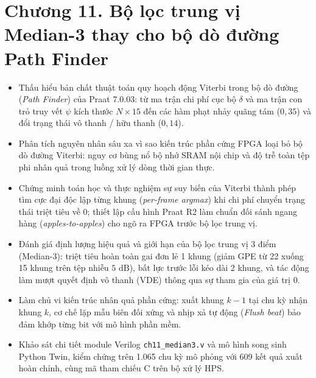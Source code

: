 \clearpage
{}
\section*{Chương 11. Bộ lọc trung vị Median-3 thay cho bộ dò đường Path Finder}

\begin{learningobj}
\begin{itemize}
    \item Thấu hiểu bản chất thuật toán quy hoạch động Viterbi trong bộ dò đường (\emph{Path Finder}) của Praat 7.0.03: từ ma trận chi phí cục bộ $\delta$ và ma trận con trỏ truy vết $\psi$ kích thước $N \times 15$ đến các hàm phạt nhảy quãng tám ($0{,}35$) và đổi trạng thái vô thanh / hữu thanh ($0{,}14$).
    \item Phân tích nguyên nhân sâu xa vì sao kiến trúc phần cứng FPGA loại bỏ bộ dò đường Viterbi: nguy cơ bùng nổ bộ nhớ SRAM nội chip và độ trễ toàn tệp phi nhân quả trong luồng xử lý dòng thời gian thực.
    \item Chứng minh toán học và thực nghiệm sự suy biến của Viterbi thành phép tìm cực đại độc lập từng khung (\emph{per-frame argmax}) khi chi phí chuyển trạng thái triệt tiêu về 0; thiết lập cấu hình Praat R2 làm chuẩn đối sánh ngang hàng (\emph{apples-to-apples}) cho ngõ ra FPGA trước bộ lọc trung vị.
    \item Đánh giá định lượng hiệu quả và giới hạn của bộ lọc trung vị 3 điểm (Median-3): triệt tiêu hoàn toàn gai đơn lẻ 1 khung (giảm GPE từ 22 xuống 15 khung trên tệp nhiễu $5\text{ dB}$), bất lực trước lỗi kéo dài 2 khung, và tác động làm mượt quyết định vô thanh (VDE) thông qua sự tham gia của giá trị $0$.
    \item Làm chủ vi kiến trúc nhân quả phần cứng: xuất khung $k-1$ tại chu kỳ nhận khung $k$, cơ chế lặp mẫu biên đối xứng và nhịp xả tự động (\emph{Flush beat}) bảo đảm khớp từng bit với mô hình phần mềm.
    \item Khảo sát chi tiết module Verilog \texttt{ch11\_median3.v} và mô hình song sinh Python Twin, kiểm chứng trên 1.065 chu kỳ mô phỏng với 609 kết quả xuất hoàn chỉnh, cùng mã tham chiếu C trên bộ xử lý HPS.
\end{itemize}
\end{learningobj}

